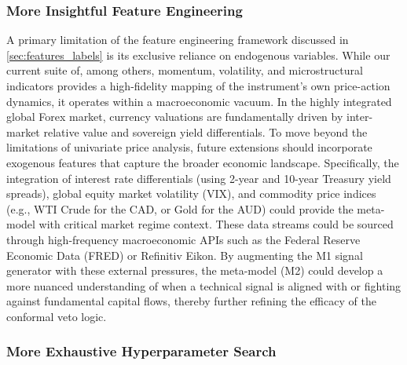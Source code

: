 \documentclass[12pt, a4paper]{article}
\begin{document}
\subsubsection{More Insightful Feature Engineering}

A primary limitation of the feature engineering framework discussed in \ref{sec:features_labels} is its exclusive reliance on endogenous variables. 
While our current suite of, among others, momentum, volatility, and microstructural indicators provides a high-fidelity mapping of the instrument's own price-action
dynamics, it operates within a macroeconomic vacuum. In the highly integrated global Forex market, currency valuations are fundamentally driven by inter-market relative value and 
sovereign yield differentials. To move beyond the limitations of univariate price analysis, future extensions should incorporate exogenous features that capture the broader economic landscape. 
Specifically, the integration of interest rate differentials (using 2-year and 10-year Treasury yield spreads), global equity market volatility (VIX), and commodity price indices 
(e.g., WTI Crude for the CAD, or Gold for the AUD) could provide the meta-model with critical market regime context. These data streams could be sourced through high-frequency 
macroeconomic APIs such as the Federal Reserve Economic Data (FRED) or Refinitiv Eikon. By augmenting the M1 signal generator with these external pressures, the meta-model (M2)
could develop a more nuanced understanding of when a technical signal is aligned with or fighting against fundamental capital flows, thereby further refining the efficacy of the 
conformal veto logic.

\subsubsection{More Exhaustive Hyperparameter Search}


\end{document}
